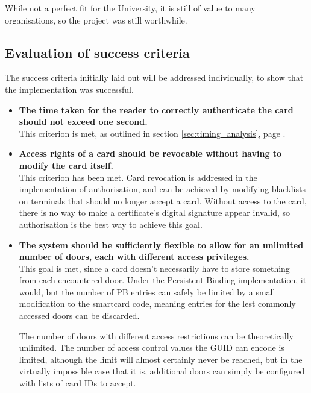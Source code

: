 \documentclass[12pt,a4paper]{article}
\begin{document}
While not a perfect fit for the University, it is still of value to many organisations, so the project was still worthwhile.



\subsection{Evaluation of success criteria}
\label{sec:success_criteria}

The success criteria initially laid out will be addressed individually, to show that the implementation was successful.
\begin{itemize}
	\item \textbf{The time taken for the reader to correctly authenticate the card should not exceed one second.}\\
	This criterion is met, as outlined in section \ref{sec:timing_analysis}, page \pageref{sec:timing_analysis}.
	
	\item \textbf{Access rights of a card should be revocable without having to modify the card itself.}\\
	This criterion has been met. Card revocation is addressed in the implementation of authorisation, and can be achieved by modifying blacklists on terminals that should no longer accept a card. Without access to the card, there is no way to make a certificate's digital signature appear invalid, so authorisation is the best way to achieve this goal.
	
	\item \textbf{The system should be sufficiently flexible to allow for an unlimited number of doors, each with different access privileges.}\\
	This goal is met, since a card doesn't necessarily have to store something from each encountered door. Under the Persistent Binding implementation, it would, but the number of PB entries can safely be limited by a small modification to the smartcard code, meaning entries for the lest commonly accessed doors can be discarded.
	
	The number of doors with different access restrictions can be theoretically unlimited. The number of access control values the GUID can encode is limited, although the limit will almost certainly never be reached, but in the virtually impossible case that it is, additional doors can simply be configured with lists of card IDs to accept.
	

\end{itemize}
\end{document}
